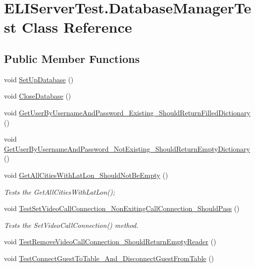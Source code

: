 \hypertarget{class_e_l_i_server_test_1_1_database_manager_test}{}\section{E\+L\+I\+Server\+Test.\+Database\+Manager\+Test Class Reference}
\label{class_e_l_i_server_test_1_1_database_manager_test}
\subsection*{Public Member Functions}
\begin{DoxyCompactItemize}
\item 
void \hyperlink{class_e_l_i_server_test_1_1_database_manager_test_a95a2603dd5f110685337e10247cd6ee8}{Set\+Up\+Database} ()
\item 
void \hyperlink{class_e_l_i_server_test_1_1_database_manager_test_a372d2287fc3767f04abcb0da2f7083b5}{Close\+Database} ()
\item 
void \hyperlink{class_e_l_i_server_test_1_1_database_manager_test_ae3979c8ede490ec1486d64c11cb80b27}{Get\+User\+By\+Username\+And\+Password\+\_\+\+Existing\+\_\+\+Should\+Return\+Filled\+Dictionary} ()
\item 
void \hyperlink{class_e_l_i_server_test_1_1_database_manager_test_acaed88f8126c6fdaa5bd4cd1fa6be54d}{Get\+User\+By\+Username\+And\+Password\+\_\+\+Not\+Existing\+\_\+\+Should\+Return\+Empty\+Dictionary} ()
\item 
void \hyperlink{class_e_l_i_server_test_1_1_database_manager_test_ab7bf6521e53fbd80f81eb4e511f33021}{Get\+All\+Cities\+With\+Lat\+Lon\+\_\+\+Should\+Not\+Be\+Empty} ()
\begin{DoxyCompactList}\small\item\em Tests the Get\+All\+Cities\+With\+Lat\+Lon(); \end{DoxyCompactList}\item 
void \hyperlink{class_e_l_i_server_test_1_1_database_manager_test_a1ee0cf59a02419278fe8f40315ed70d4}{Test\+Set\+Video\+Call\+Connection\+\_\+\+Non\+Exiting\+Call\+Connection\+\_\+\+Should\+Pass} ()
\begin{DoxyCompactList}\small\item\em Tests the Set\+Video\+Call\+Connection() method. \end{DoxyCompactList}\item 
void \hyperlink{class_e_l_i_server_test_1_1_database_manager_test_af2f50852258bd02b89000d273fafa656}{Test\+Remove\+Video\+Call\+Connection\+\_\+\+Should\+Return\+Empty\+Reader} ()
\item 
void \hyperlink{class_e_l_i_server_test_1_1_database_manager_test_a047ce6976cea92b0f06c941eee84ad2f}{Test\+Connect\+Guest\+To\+Table\+\_\+\+And\+\_\+\+Disconnect\+Guest\+From\+Table} ()
\end{DoxyCompactItemize}
